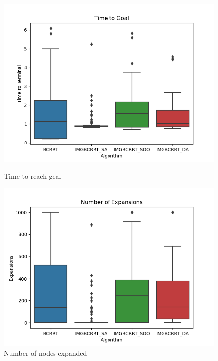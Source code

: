 \documentclass{article}
\begin{document}
\begin{figure}[h]
	\centering
\begin{minipage}{.5\textwidth}
\centering
	\includegraphics[scale=0.45]{TTG1.png}
        \caption{Time to reach goal}
\end{minipage}%
\begin{minipage}{.5\textwidth}
\centering
	\includegraphics[scale=0.45]{Expans1.png}
        \caption{Number of nodes expanded}
\end{minipage}

\end{figure}

\vspace{1cm}
\end{document}
